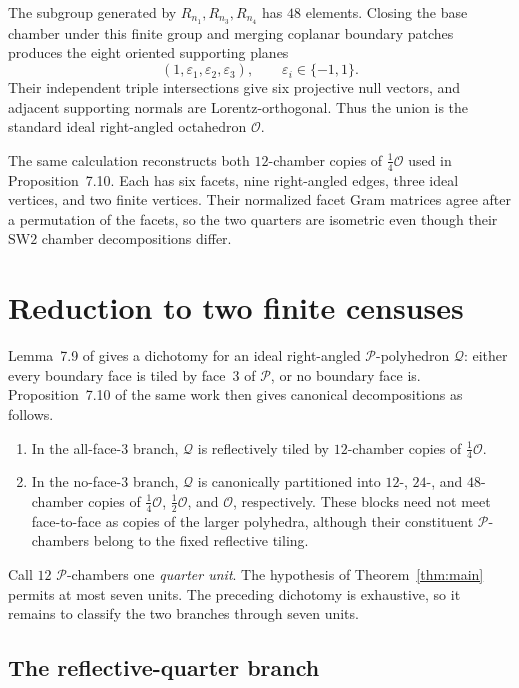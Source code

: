 \documentclass[11pt]{article}
\theoremstyle{remark}
\newcommand{\OO}{\mathcal O}
\newcommand{\PP}{\mathcal P}
\newcommand{\QQ}{\mathcal Q}
\begin{document}
The subgroup generated by $R_{n_1},R_{n_3},R_{n_4}$ has $48$ elements.
Closing the base chamber under this finite group and merging coplanar
boundary patches produces the eight oriented supporting planes
\begin{equation}\label{eq:standard-oct}
  (1,\varepsilon_1,\varepsilon_2,\varepsilon_3),
  \qquad \varepsilon_i\in\{-1,1\}.
\end{equation}
Their independent triple intersections give six projective null vectors,
and adjacent supporting normals are Lorentz-orthogonal.  Thus the union is
the standard ideal right-angled octahedron $\OO$.

The same calculation reconstructs both $12$-chamber copies of
$\tfrac14\OO$ used in Proposition~7.10.  Each has six facets, nine
right-angled edges, three ideal vertices, and two finite vertices.  Their
normalized facet Gram matrices agree after a permutation of the facets, so
the two quarters are isometric even though their $\mathrm{SW2}$ chamber
decompositions differ.

\section{Reduction to two finite censuses}

Lemma~7.9 of \cite{allcock2026arithmetic} gives a dichotomy for an ideal
right-angled $\PP$-polyhedron $\QQ$: either every boundary face is tiled by
face~3 of $\PP$, or no boundary face is.  Proposition~7.10 of the same work
then gives canonical decompositions as follows.

\begin{enumerate}
\item In the all-face-3 branch, $\QQ$ is reflectively tiled by
  $12$-chamber copies of $\tfrac14\OO$.
\item In the no-face-3 branch, $\QQ$ is canonically partitioned into
  $12$-, $24$-, and $48$-chamber copies of
  $\tfrac14\OO$, $\tfrac12\OO$, and $\OO$, respectively.  These blocks
  need not meet face-to-face as copies of the larger polyhedra, although
  their constituent $\PP$-chambers belong to the fixed reflective tiling.
\end{enumerate}

Call $12$ $\PP$-chambers one \emph{quarter unit}.  The hypothesis of
Theorem~\ref{thm:main} permits at most seven units.  The preceding dichotomy
is exhaustive, so it remains to classify the two branches through seven
units.

\subsection{The reflective-quarter branch}
\end{document}
